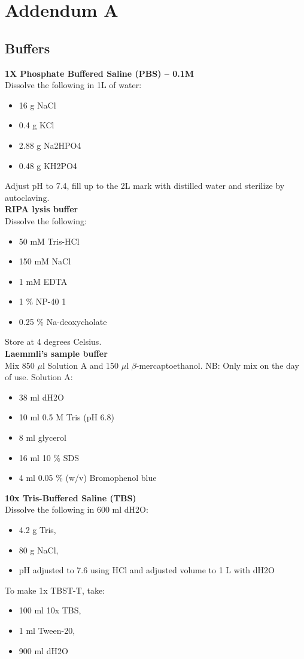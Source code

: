 \chapter*{Addendum A}\label{addendum}

\section*{Buffers}

\noindent
\textbf{1X Phosphate Buffered Saline (PBS) – 0.1M}\\
Dissolve the following in 1L of water:
\begin{itemize}
\item 16 g NaCl 
\item 0.4 g KCl 
\item 2.88 g Na2HPO4 
\item 0.48 g KH2PO4 
\end{itemize}
Adjust pH to 7.4, fill up to the 2L mark with distilled water and sterilize by autoclaving.\\

\noindent
\textbf{RIPA lysis buffer}\\
Dissolve the following:
\begin{itemize}
\item 50 mM Tris-HCl
\item 150 mM NaCl 
\item 1 mM EDTA 
\item 1 \% NP-40 1
\item 0.25 \% Na-deoxycholate 
\end{itemize}
Store at 4 degrees Celsius.\\

\noindent
\textbf{Laemmli’s sample buffer}\\
Mix 850 $\mu$l Solution A and 150 $\mu$l $\beta$-mercaptoethanol. NB: Only mix on the day of use. Solution A:
\begin{itemize}
\item 38 ml dH2O
\item 10 ml 0.5 M Tris (pH 6.8)
\item 8 ml glycerol
\item 16 ml 10 \% SDS
\item 4 ml 0.05 \% (w/v) Bromophenol blue
\end{itemize}

\noindent
\textbf{10x Tris-Buffered Saline (TBS)}\\
Dissolve the following in 600 ml dH2O:
\begin{itemize}
\item 4.2 g Tris, 
\item 80 g NaCl,   
\item pH adjusted to 7.6 using HCl and adjusted volume to 1 L with dH2O
\end{itemize}
\noindent
To make 1x TBST-T, take:
\begin{itemize}
\item 100 ml 10x TBS, 
\item 1 ml Tween-20, 
\item 900 ml dH2O
\end{itemize}

